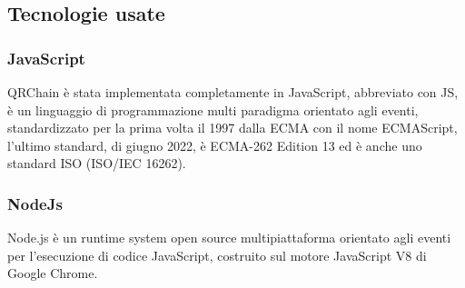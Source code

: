 \subsection{Tecnologie usate}
\subsubsection{JavaScript}
QRChain è stata implementata completamente in JavaScript, abbreviato con JS, è un linguaggio di programmazione multi paradigma orientato agli eventi, standardizzato per la prima volta il 1997 dalla ECMA con il nome ECMAScript, l'ultimo standard, di giugno 2022, è ECMA-262 Edition 13 ed è anche uno standard ISO (ISO/IEC 16262).

\subsubsection{NodeJs}
Node.js è un runtime system open source multipiattaforma orientato agli eventi per l'esecuzione di codice JavaScript, costruito sul motore JavaScript V8 di Google Chrome.